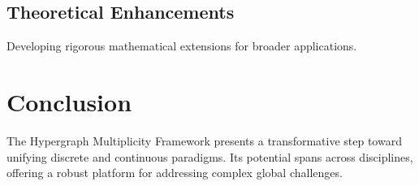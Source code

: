 \documentclass{article}
\theoremstyle{plain}
\begin{document}
\subsection{Theoretical Enhancements}
Developing rigorous mathematical extensions for broader applications.

\section{Conclusion}
The Hypergraph Multiplicity Framework presents a transformative step toward unifying discrete and continuous paradigms. Its potential spans across disciplines, offering a robust platform for addressing complex global challenges.



\end{document}
